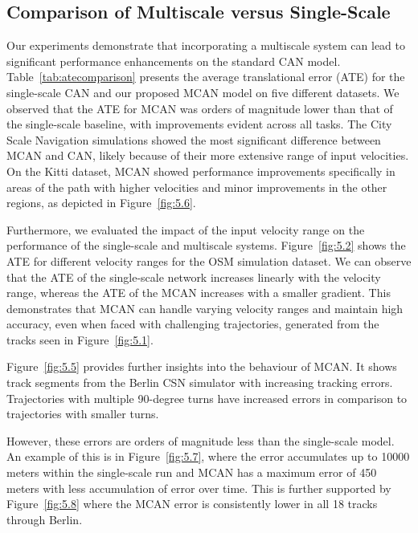 
\subsection{Comparison of Multiscale versus Single-Scale}
\label{subsec:Performance}

Our experiments demonstrate that incorporating a multiscale system can lead to significant performance enhancements on the standard CAN model. Table~\ref{tab:atecomparison} presents the average translational error (ATE) for the single-scale CAN and our proposed MCAN model on five different datasets. We observed that the ATE for MCAN was orders of magnitude lower than that of the single-scale baseline, with improvements evident across all tasks. The City Scale Navigation simulations showed the most significant difference between MCAN and CAN, likely because of their more extensive range of input velocities. On the Kitti dataset, MCAN showed performance improvements specifically in areas of the path with higher velocities and minor improvements in the other regions, as depicted in Figure~\ref{fig:5.6}. 

Furthermore, we evaluated the impact of the input velocity range on the performance of the single-scale and multiscale systems. Figure~\ref{fig:5.2} shows the ATE for different velocity ranges for the OSM simulation dataset. We can observe that the ATE of the single-scale network increases linearly with the velocity range, whereas the ATE of the MCAN increases with a smaller gradient. This demonstrates that MCAN can handle varying velocity ranges and maintain high accuracy, even when faced with challenging trajectories, generated from the tracks seen in Figure~\ref{fig:5.1}.

%

%

Figure~\ref{fig:5.5} provides further insights into the behaviour of MCAN. It shows track segments from the Berlin CSN simulator with increasing tracking errors. Trajectories with multiple 90-degree turns have increased errors in comparison to trajectories with smaller turns. 

%

However, these errors are orders of magnitude less than the single-scale model. An example of this is in Figure~\ref{fig:5.7}, where the error accumulates up to 10000 meters within the single-scale run and MCAN has a maximum error of 450 meters with less accumulation of error over time. This is further supported by Figure~\ref{fig:5.8} where the MCAN error is consistently lower in all 18 tracks through Berlin. 



